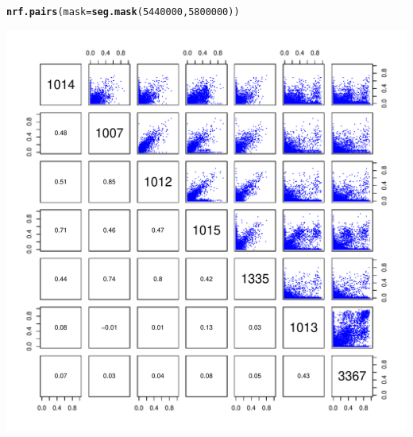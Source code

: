 \documentclass{article}\usepackage[]{graphicx}\usepackage[]{color}
\makeatletter
\def\maxwidth{ %
  \ifdim\Gin@nat@width>\linewidth
    \linewidth
  \else
    \Gin@nat@width
  \fi
}
\newcommand{\hlnum}[1]{\textcolor[rgb]{0.686,0.059,0.569}{#1}}%
\newcommand{\hlstd}[1]{\textcolor[rgb]{0.345,0.345,0.345}{#1}}%
\newcommand{\hlkwc}[1]{\textcolor[rgb]{0.333,0.667,0.333}{#1}}%
\newcommand{\hlkwd}[1]{\textcolor[rgb]{0.737,0.353,0.396}{\textbf{#1}}}%
\newenvironment{kframe}{%
 \def\at@end@of@kframe{}%
 \ifinner\ifhmode%
  \def\at@end@of@kframe{\end{minipage}}%
  \begin{minipage}{\columnwidth}%
 \fi\fi%
 \def\FrameCommand##1{\hskip\@totalleftmargin \hskip-\fboxsep
 \colorbox{shadecolor}{##1}\hskip-\fboxsep
     \hskip-\linewidth \hskip-\@totalleftmargin \hskip\columnwidth}%
 \MakeFramed {\advance\hsize-\width
   \@totalleftmargin\z@ \linewidth\hsize
   \@setminipage}}%
 {\par\unskip\endMakeFramed%
 \at@end@of@kframe}
\newenvironment{knitrout}{}{} %
\makeatother
\begin{document}
\begin{knitrout}\footnotesize
{}\color{fgcolor}\begin{kframe}
\begin{alltt}
\hlkwd{nrf.pairs}\hlstd{(}\hlkwc{mask}\hlstd{=}\hlkwd{seg.mask}\hlstd{(}\hlnum{5440000}\hlstd{,}\hlnum{5800000}\hlstd{))}
\end{alltt}
\end{kframe}

{\centering \includegraphics[width=\maxwidth]{figs-knitr/unnamed-chunk-38-1} 

}



\end{knitrout}
\end{document}
